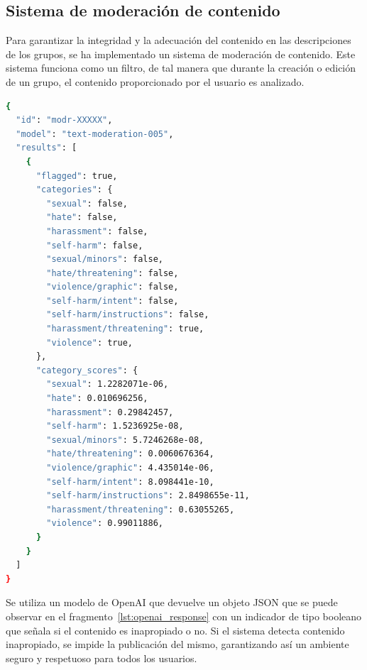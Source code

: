 \subsection{Sistema de moderación de contenido}
Para garantizar la integridad y la adecuación del contenido en las descripciones de los grupos, se ha implementado un sistema de moderación de contenido. Este sistema funciona como un filtro, de tal manera que durante la creación o edición de un grupo, el contenido proporcionado por el usuario es analizado. 


\lstset{style=mystyle}
\begin{lstlisting}[language=Bash, caption={Respuesta JSON del modelo de moderación de OpenAI}, label=lst:openai_response, captionpos=b]
{
  "id": "modr-XXXXX",
  "model": "text-moderation-005",
  "results": [
    {
      "flagged": true,
      "categories": {
        "sexual": false,
        "hate": false,
        "harassment": false,
        "self-harm": false,
        "sexual/minors": false,
        "hate/threatening": false,
        "violence/graphic": false,
        "self-harm/intent": false,
        "self-harm/instructions": false,
        "harassment/threatening": true,
        "violence": true,
      },
      "category_scores": {
        "sexual": 1.2282071e-06,
        "hate": 0.010696256,
        "harassment": 0.29842457,
        "self-harm": 1.5236925e-08,
        "sexual/minors": 5.7246268e-08,
        "hate/threatening": 0.0060676364,
        "violence/graphic": 4.435014e-06,
        "self-harm/intent": 8.098441e-10,
        "self-harm/instructions": 2.8498655e-11,
        "harassment/threatening": 0.63055265,
        "violence": 0.99011886,
      }
    }
  ]
}
\end{lstlisting}


Se utiliza un modelo de OpenAI\cite{REF10}  que devuelve un objeto JSON que se puede observar en el fragmento~\ref{lst:openai_response} con un indicador de tipo booleano que señala si el contenido es inapropiado o no. Si el sistema detecta contenido inapropiado, se impide la publicación del mismo, garantizando así un ambiente seguro y respetuoso para todos los usuarios.






